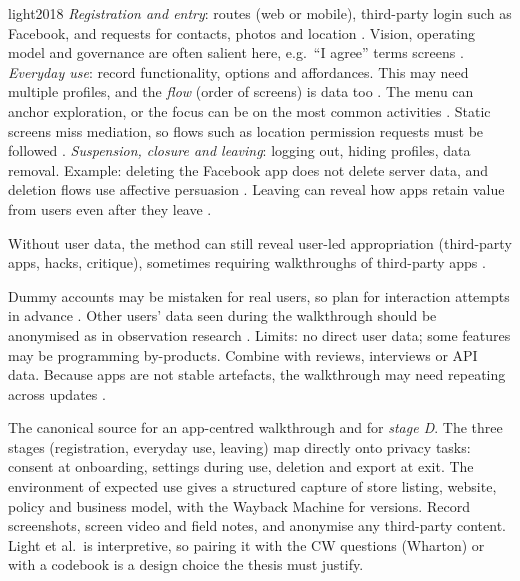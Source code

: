 \begin{papercard}{light2018}
 \emph{Registration and entry}: routes (web or mobile), third-party login such as Facebook, and requests for contacts, photos and location . Vision, operating model and governance are often salient here, e.g.\ ``I agree'' terms screens . \emph{Everyday use}: record functionality, options and affordances. This may need multiple profiles, and the \emph{flow} (order of screens) is data too . The menu can anchor exploration, or the focus can be on the most common activities . Static screens miss mediation, so flows such as location permission requests must be followed . \emph{Suspension, closure and leaving}: logging out, hiding profiles, data removal. Example: deleting the Facebook app does not delete server data, and deletion flows use affective persuasion . Leaving can reveal how apps retain value from users even after they leave .

 Without user data, the method can still reveal user-led appropriation (third-party apps, hacks, critique), sometimes requiring walkthroughs of third-party apps .

 Dummy accounts may be mistaken for real users, so plan for interaction attempts in advance . Other users' data seen during the walkthrough should be anonymised as in observation research . Limits: no direct user data; some features may be programming by-products. Combine with reviews, interviews or API data. Because apps are not stable artefacts, the walkthrough may need repeating across updates .

 The canonical source for an app-centred walkthrough and for \emph{stage D}. The three stages (registration, everyday use, leaving) map directly onto privacy tasks: consent at onboarding, settings during use, deletion and export at exit. The environment of expected use gives a structured capture of store listing, website, policy and business model, with the Wayback Machine for versions. Record screenshots, screen video and field notes, and anonymise any third-party content. Light et al.\ is interpretive, so pairing it with the CW questions (Wharton) or with a codebook is a design choice the thesis must justify.
\end{papercard}
